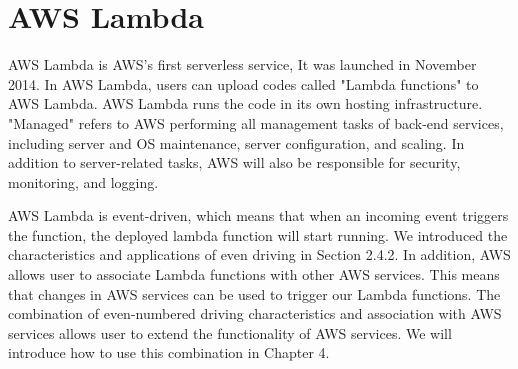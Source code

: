 \section{AWS Lambda}
AWS Lambda is AWS's first serverless service,
It was launched in November 2014. In AWS Lambda, users can upload codes called "Lambda functions" to AWS Lambda. AWS Lambda runs the code in its own hosting infrastructure. "Managed" refers to AWS performing all management tasks of back-end services, including server and OS maintenance, server configuration, and scaling. In addition to server-related tasks, AWS will also be responsible for security, monitoring, and logging.
\par
AWS Lambda is event-driven, which means that when an incoming event triggers the function, the deployed lambda function will start running. We introduced the characteristics and applications of even driving in Section 2.4.2. In addition, AWS allows user to associate Lambda functions with other AWS services. This means that changes in AWS services can be used to trigger our Lambda functions. The combination of even-numbered driving characteristics and association with AWS services allows user to extend the functionality of AWS services. We will introduce how to use this combination in Chapter 4.
